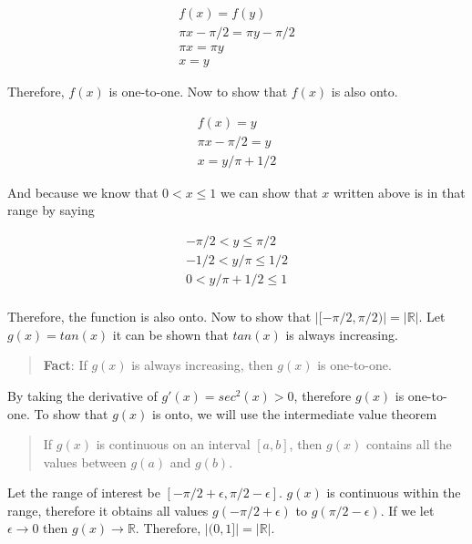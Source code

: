 \documentclass[11pt,a4paper,final]{article}
\begin{document}
\begin{equation*}
\begin{array}{l}
f(x) = f(y) \\
\pi x - \pi/2 = \pi y - \pi/2 \\
\pi x = \pi y \\
x = y
\end{array}
\end{equation*}

Therefore, \(f(x)\) is one-to-one. Now to show that \(f(x)\) is also onto.

\begin{equation*}
\begin{array}{l}
f(x) = y \\
\pi x - \pi / 2 = y \\
x = y/\pi + 1/2
\end{array}
\end{equation*}

And because we know that \(0 < x \le 1\) we can show that \(x\) written above is in that range by saying

\begin{equation*}
\begin{array}{l}
- \pi/2 < y \le \pi/2 \\
- 1/2 < y/\pi \le 1/2 \\
0 < y/\pi + 1/2 \le 1\\
\end{array}
\end{equation*}

Therefore, the function is also onto. Now to show that \(\big|[-\pi/2, \pi/2)\big| = \big| \mathbb{R} \big|\). Let \(g(x) = tan(x)\) it
can be shown that \(tan(x)\) is always increasing.

\begin{quote}
\textbf{Fact}: If \(g(x)\) is always increasing, then \(g(x)\) is one-to-one.
\end{quote}

By taking the derivative of \(g'(x) = sec^2(x) > 0\), therefore \(g(x)\) is one-to-one. To show that \(g(x)\) is onto, we will
use the intermediate value theorem

\begin{quote}
If \(g(x)\) is continuous on an interval \([a,b]\), then \(g(x)\) contains all the values between \(g(a)\) and \(g(b)\).
\end{quote}

Let the range of interest be \([-\pi/2 + \epsilon, \pi/2 - \epsilon]\). \(g(x)\) is continuous within the range, therefore it obtains all
values \(g(-\pi/2 + \epsilon)\) to \(g(\pi/2 - \epsilon)\). If we let \(\epsilon \rightarrow 0\) then \(g(x) \rightarrow \mathbb{R}\). Therefore, \(\big|(0,1]\big| = \big| \mathbb{R} \big|\).
\end{document}
